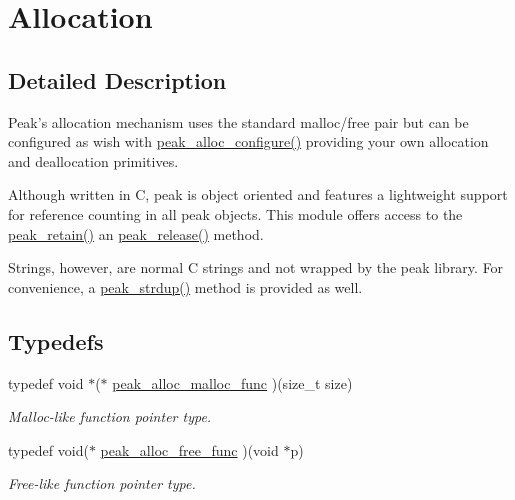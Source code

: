 \hypertarget{group__alloc}{
\section{Allocation}
\label{group__alloc}
}


\subsection{Detailed Description}
\begin{Desc}
\item[]Peak's allocation mechanism uses the standard malloc/free pair but can be configured as wish with \hyperlink{group__alloc_ga3}{peak\_\-alloc\_\-configure()} providing your own allocation and deallocation primitives.\end{Desc}
\begin{Desc}
\item[]Although written in C, peak is object oriented and features a lightweight support for reference counting in all peak objects. This module offers access to the \hyperlink{group__alloc_ga6}{peak\_\-retain()} an \hyperlink{group__alloc_ga7}{peak\_\-release()} method.\par
 Strings, however, are normal C strings and not wrapped by the peak library. For convenience, a \hyperlink{group__alloc_ga6}{peak\_\-strdup()} method is provided as well. \end{Desc}


\subsection*{Typedefs}
\begin{CompactItemize}
\item 
\hypertarget{group__alloc_ga0}{
typedef void $\ast$($\ast$ \hyperlink{group__alloc_ga0}{peak\_\-alloc\_\-malloc\_\-func} )(size\_\-t size)}
\label{group__alloc_ga0}

\begin{CompactList}\small\item\em Malloc-like function pointer type. \item\end{CompactList}\item 
\hypertarget{group__alloc_ga1}{
typedef void($\ast$ \hyperlink{group__alloc_ga1}{peak\_\-alloc\_\-free\_\-func} )(void $\ast$p)}
\label{group__alloc_ga1}

\begin{CompactList}\small\item\em Free-like function pointer type. \item\end{CompactList}\end{CompactItemize}
